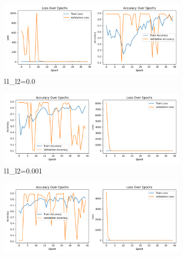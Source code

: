 \documentclass[a4paper, 10pt]{article}
\begin{document}
	
	\begin{figure}[htbp] 
		\centering 
		
		\begin{subfigure}{0.5\textwidth}
			\includegraphics[width=\linewidth]{picture/sz640_training_validation_curves}
			\caption{l1\_l2=0.0}
			\label{fig: reg1}	
		\end{subfigure}
		\begin{subfigure}{0.5\textwidth}
			\includegraphics[width=\linewidth]{picture/sz640_training_validation_curves_regl1_l2=0.001}
			\caption{l1\_l2=0.001}
			\label{fig: reg2}
		\end{subfigure}	
		\begin{subfigure}{0.5\textwidth}
			\includegraphics[width=\linewidth]{picture/sz640_training_validation_curves_regl1_l2=0.01}

\end{subfigure}
\end{figure}
\end{document}
